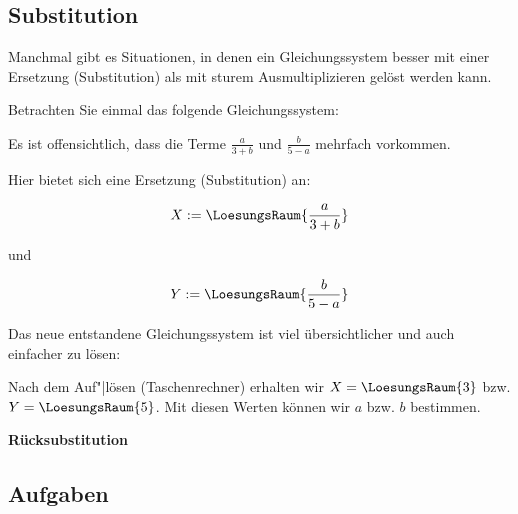 \subsection{Substitution}
Manchmal gibt es Situationen, in denen ein Gleichungssystem besser mit
einer Ersetzung (Substitution) als mit sturem Ausmultiplizieren gelöst
werden kann.

Betrachten Sie einmal das folgende Gleichungssystem:


Es ist offensichtlich, dass die Terme $\frac{a}{3+b}$ und
$\frac{b}{5-a}$ mehrfach vorkommen.

Hier bietet sich eine Ersetzung (Substitution) an:

$$X := \LoesungsRaum{\frac{a}{3+b}}$$

und

$$Y := \LoesungsRaum{\frac{b}{5-a}}$$

Das neue entstandene Gleichungssystem ist viel übersichtlicher und
auch einfacher zu lösen:


Nach dem Auf"|lösen (\zB Taschenrechner) erhalten wir $X=\LoesungsRaum{3}$ bzw. $Y=\LoesungsRaum{5}$. Mit diesen Werten
können wir $a$ bzw. $b$ bestimmen.
\newpage

\textbf{Rücksubstitution}\,\\

\vspace{1mm}

\newpage


\subsection*{Aufgaben}
